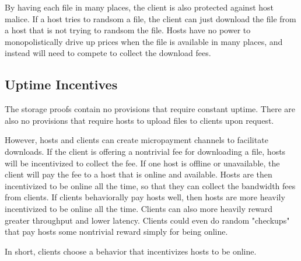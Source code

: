 \documentclass[twocolumn]{article}
\begin{document}
By having each file in many places, the client is also protected against host malice.
If a host tries to randsom a file, the client can just download the file from a host that is not trying to randsom the file.
Hosts have no power to monopolistically drive up prices when the file is available in many places, and instead will need to compete to collect the download fees.

\subsection{Uptime Incentives}
The storage proofs contain no provisions that require constant uptime.
There are also no provisions that require hosts to upload files to clients upon request.

However, hosts and clients can create micropayment channels to facilitate downloads.
If the client is offering a nontrivial fee for downloading a file, hosts will be incentivized to collect the fee.
If one host is offline or unavailable, the client will pay the fee to a host that is online and available.
Hosts are then incentivized to be online all the time, so that they can collect the bandwidth fees from clients.
If clients behaviorally pay hosts well, then hosts are more heavily incentivized to be online all the time.
Clients can also more heavily reward greater throughput and lower latency.
Clients could even do random "checkups" that pay hosts some nontrivial reward simply for being online.

In short, clients choose a behavior that incentivizes hosts to be online.

%

\end{document}
